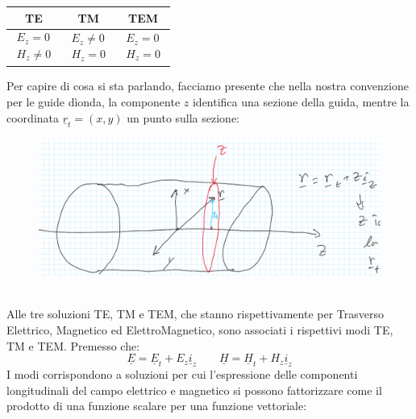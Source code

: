 \documentclass{book}
\begin{document}
        \begin{center}
            \begin{tabular}{|| c | c | c ||}
                \hline
                TE & TM & TEM \\
                 \hline
                $\begin{matrix} E_{z}=0 \\ H_{z} \neq 0 \end{matrix}$ &
                $\begin{matrix} E_{z} \neq 0 \\ H_{z} = 0 \end{matrix}$ &
                $\begin{matrix} E_{z}=0 \\ H_{z} = 0 \end{matrix}$  \\
                \hline
            \end{tabular}
        \end{center} \newpage
        Per capire di cosa si sta parlando, facciamo presente che nella nostra convenzione per le guide dìonda, la componente $z$ identifica una sezione della guida, mentre
        la coordinata $\underline{r}_{t}=(x,y)$ un punto sulla sezione:
        \begin{figure}[h!]
            \center 
            \includegraphics[width=0.75\linewidth]{Chapter_two/Chapt2img3.png}
        \end{figure} \\
        Alle tre soluzioni TE, TM e TEM, che stanno rispettivamente per Trasverso Elettrico, Magnetico ed ElettroMagnetico,
        sono associati i rispettivi modi TE, TM e TEM. Premesso che:
        \begin{equation}
            \underline{E} = \underline{E}_{t}+E_{z}\underline{i}_{z} \qquad \underline{H} = \underline{H}_{t}+H_{z}\underline{i}_{z}
        \end{equation}
        I modi corrispondono a soluzioni per cui l'espressione delle componenti longitudinali del campo 
        elettrico e magnetico si possono fattorizzare come il prodotto di una funzione scalare per una funzione vettoriale:
\end{document}
